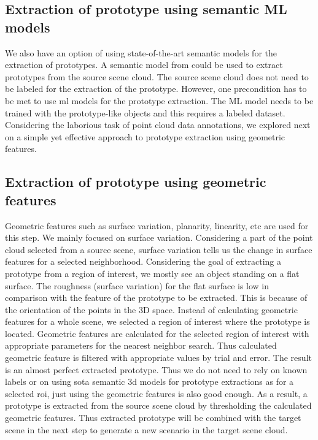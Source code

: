 \subsection{Extraction of prototype using semantic ML models}
We also have an option of using state-of-the-art semantic models for the extraction of prototypes. A semantic model from \parencite{Chen2022} could be used to extract prototypes from the source scene cloud. The source scene cloud does not need to be labeled for the extraction of the prototype. However, one precondition has to be met to use \acrshort{ml} models for the prototype extraction. The ML model needs to be trained with the prototype-like objects and this requires a labeled dataset. Considering the laborious task of point cloud data annotations, we explored next on a simple yet effective approach to prototype extraction using geometric features.

\subsection{Extraction of prototype using geometric features}
Geometric features such as surface variation, planarity, linearity, etc are used for this step. We mainly focused on surface variation. Considering a part of the point cloud selected from a source scene, surface variation tells us the change in surface features for a selected neighborhood. Considering the goal of extracting a prototype from a region of interest, we mostly see an object standing on a flat surface. The roughness (surface variation) for the flat surface is low in comparison with the feature of the prototype to be extracted. This is because of the orientation of the points in the 3D space. Instead of calculating geometric features for a whole scene, we selected a region of interest where the prototype is located. Geometric features are calculated for the selected region of interest with appropriate parameters for the nearest neighbor search. Thus calculated geometric feature is filtered with appropriate values by trial and error. The result is an almost perfect extracted prototype. Thus we do not need to rely on known labels or on using \acrshort{sota} semantic 3d models for prototype extractions as for a selected \acrfull{roi}, just using the geometric features is also good enough. As a result, a prototype is extracted from the source scene cloud by thresholding the calculated geometric features. Thus extracted prototype will be combined with the target scene in the next step to generate a new scenario in the target scene cloud.

